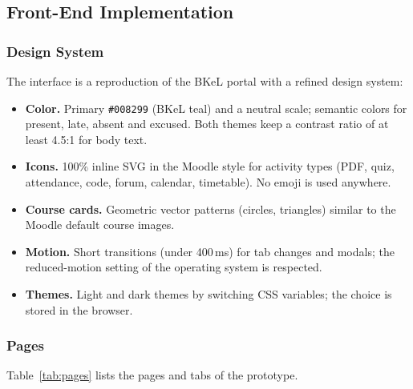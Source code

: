 \subsection{Front-End Implementation}

\subsubsection{Design System}

The interface is a reproduction of the BKeL portal with a refined design system:

\begin{itemize}
    \item \textbf{Color.} Primary \texttt{\#008299} (BKeL teal) and a neutral scale; semantic colors for present, late, absent and excused. Both themes keep a contrast ratio of at least 4.5:1 for body text.
    \item \textbf{Icons.} 100\% inline SVG in the Moodle style for activity types (PDF, quiz, attendance, code, forum, calendar, timetable). No emoji is used anywhere.
    \item \textbf{Course cards.} Geometric vector patterns (circles, triangles) similar to the Moodle default course images.
    \item \textbf{Motion.} Short transitions (under 400\,ms) for tab changes and modals; the reduced-motion setting of the operating system is respected.
    \item \textbf{Themes.} Light and dark themes by switching CSS variables; the choice is stored in the browser.
\end{itemize}

\subsubsection{Pages}

Table~\ref{tab:pages} lists the pages and tabs of the prototype.

